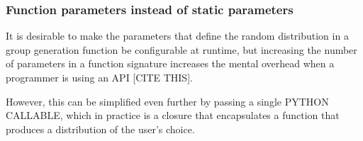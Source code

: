 \subsubsection{Function parameters instead of static parameters}

It is desirable to make the parameters that define the random distribution in a group
generation function be configurable at runtime, but increasing the number of
parameters in a function signature increases the mental overhead when a programmer is
using an API [CITE THIS]. 

However,
this can be simplified even further by passing a single PYTHON CALLABLE, which
in practice is a closure that encapsulates a function that produces a
distribution of the user's choice. 